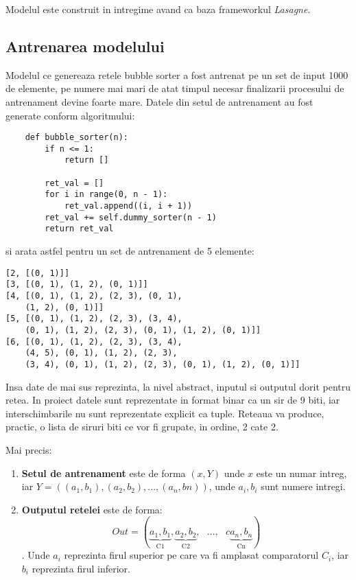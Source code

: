 \documentclass[12pt]{article}
\begin{document}
Modelul este construit in intregime avand ca baza frameworkul \textit{Lasagne}.

\subsection{Antrenarea modelului}

Modelul ce genereaza retele bubble sorter a fost antrenat pe un set de input 1000 de elemente, pe numere mai mari de atat timpul necesar finalizarii procesului de antrenament devine foarte mare. Datele din setul de antrenament au fost generate conform algoritmului:
\begin{lstlisting}
    def bubble_sorter(n):
        if n <= 1:
            return []

        ret_val = []
        for i in range(0, n - 1):
            ret_val.append((i, i + 1))
        ret_val += self.dummy_sorter(n - 1)
        return ret_val
\end{lstlisting}

si arata astfel pentru un set de antrenament de 5 elemente:

\begin{lstlisting}
[2, [(0, 1)]]
[3, [(0, 1), (1, 2), (0, 1)]]
[4, [(0, 1), (1, 2), (2, 3), (0, 1), 
	(1, 2), (0, 1)]]
[5, [(0, 1), (1, 2), (2, 3), (3, 4), 
	(0, 1), (1, 2), (2, 3), (0, 1), (1, 2), (0, 1)]]
[6, [(0, 1), (1, 2), (2, 3), (3, 4), 
	(4, 5), (0, 1), (1, 2), (2, 3), 
	(3, 4), (0, 1), (1, 2), (2, 3), (0, 1), (1, 2), (0, 1)]]
\end{lstlisting}

Insa date de mai sus reprezinta, la nivel abstract, inputul si outputul dorit pentru retea. In proiect datele sunt reprezentate in format binar ca un sir de 9 biti, iar interschimbarile nu sunt reprezentate explicit ca tuple. Reteaua va produce, practic, o lista de siruri biti ce vor fi grupate, in ordine, 2 cate 2. 

Mai precis:
\begin{enumerate}
	\item \textbf{Setul de antrenament} este de forma $(x, Y)$ unde $x$ este un numar intreg, iar 
	$Y=((a_1, b_1), (a_2, b_2), ..., (a_n, bn))$, unde $a_i, b_i$ sunt numere intregi.
	\item \textbf{Outputul retelei} este de forma:
	$$Out=(\underbrace{a_1, b_1}_{\text{C1}}, \underbrace{a_2, b_2}_{\text{C2}},\ \ \  ..., \ \ \ c
	 \underbrace{a_n, b_n}_{\text{Cn}})$$.
	Unde $a_i$ reprezinta firul superior pe care va fi amplasat comparatorul $C_i$, iar $b_i$ reprezinta firul inferior. 
\end{enumerate}
\end{document}
